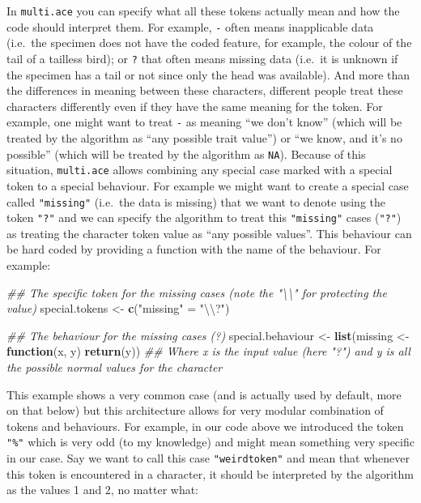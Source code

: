 \documentclass[
]{book}
\newenvironment{Shaded}{\begin{snugshade}}{\end{snugshade}}
\newcommand{\CharTok}[1]{\textcolor[rgb]{0.31,0.60,0.02}{#1}}
\newcommand{\CommentTok}[1]{\textcolor[rgb]{0.56,0.35,0.01}{\textit{#1}}}
\newcommand{\ControlFlowTok}[1]{\textcolor[rgb]{0.13,0.29,0.53}{\textbf{#1}}}
\newcommand{\KeywordTok}[1]{\textcolor[rgb]{0.13,0.29,0.53}{\textbf{#1}}}
\newcommand{\NormalTok}[1]{#1}
\newcommand{\StringTok}[1]{\textcolor[rgb]{0.31,0.60,0.02}{#1}}
\begin{document}
In \texttt{multi.ace} you can specify what all these tokens actually mean and how the code should interpret them.
For example, \texttt{-} often means inapplicable data (i.e.~the specimen does not have the coded feature, for example, the colour of the tail of a tailless bird); or \texttt{?} that often means missing data (i.e.~it is unknown if the specimen has a tail or not since only the head was available).
And more than the differences in meaning between these characters, different people treat these characters differently even if they have the same meaning for the token.
For example, one might want to treat \texttt{-} as meaning ``we don't know'' (which will be treated by the algorithm as ``any possible trait value'') or ``we know, and it's no possible'' (which will be treated by the algorithm as \texttt{NA}).
Because of this situation, \texttt{multi.ace} allows combining any special case marked with a special token to a special behaviour.
For example we might want to create a special case called \texttt{"missing"} (i.e.~the data is missing) that we want to denote using the token \texttt{"?"} and we can specify the algorithm to treat this \texttt{"missing"} cases (\texttt{"?"}) as treating the character token value as ``any possible values''.
This behaviour can be hard coded by providing a function with the name of the behaviour.
For example:

\begin{Shaded}
\begin{Highlighting}[]
\CommentTok{\#\# The specific token for the missing cases (note the "\textbackslash{}\textbackslash{}" for protecting the value)}
\NormalTok{special.tokens \textless{}{-}}\StringTok{ }\KeywordTok{c}\NormalTok{(}\StringTok{"missing"}\NormalTok{ =}\StringTok{ "}\CharTok{\textbackslash{}\textbackslash{}}\StringTok{?"}\NormalTok{)}

\CommentTok{\#\# The behaviour for the missing cases (?)}
\NormalTok{special.behaviour \textless{}{-}}\StringTok{ }\KeywordTok{list}\NormalTok{(missing \textless{}{-}}\StringTok{ }\ControlFlowTok{function}\NormalTok{(x, y) }\KeywordTok{return}\NormalTok{(y))}
\CommentTok{\#\# Where x is the input value (here "?") and y is all the possible normal values for the character}
\end{Highlighting}
\end{Shaded}

This example shows a very common case (and is actually used by default, more on that below) but this architecture allows for very modular combination of tokens and behaviours.
For example, in our code above we introduced the token \texttt{"\%"} which is very odd (to my knowledge) and might mean something very specific in our case.
Say we want to call this case \texttt{"weirdtoken"} and mean that whenever this token is encountered in a character, it should be interpreted by the algorithm as the values 1 and 2, no matter what:
\end{document}
